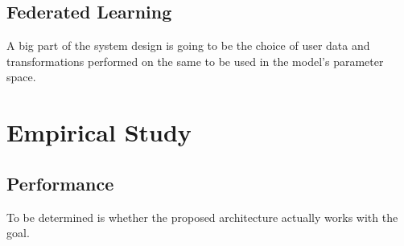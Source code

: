 \documentclass[
    fontsize=12pt,
    headings=small,
    parskip=half,           %
    bibliography=totoc,
    numbers=noenddot,       %
    open=any,               %
    final                   %
    ]{scrreprt}
\begin{document}
\section{Federated Learning}

A big part of the system design is going to be the choice of user data and transformations performed on the same to be used in the model's parameter space.


\chapter{Empirical Study}

\section{Performance}

To be determined is whether the proposed architecture actually works with the goal.

\fi


\begin{raggedright}
  \printbibliography
\end{raggedright}
\end{document}
